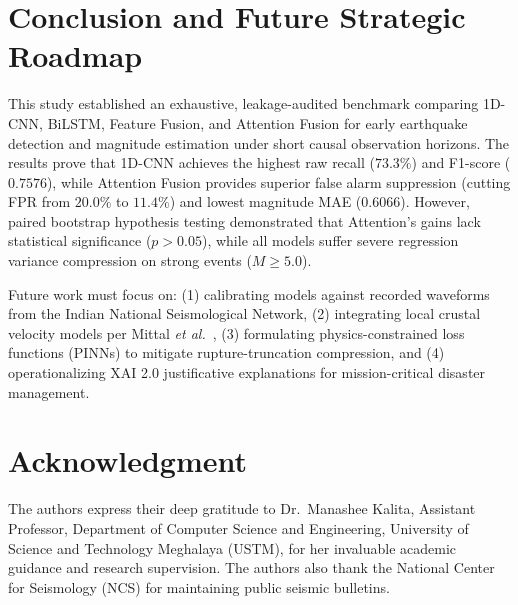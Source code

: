\documentclass[journal]{IEEEtran}
\begin{document}
\section{Conclusion and Future Strategic Roadmap}
This study established an exhaustive, leakage-audited benchmark comparing 1D-CNN, BiLSTM, Feature Fusion, and Attention Fusion for early earthquake detection and magnitude estimation under short causal observation horizons. The results prove that 1D-CNN achieves the highest raw recall ($73.3\%$) and F1-score ($0.7576$), while Attention Fusion provides superior false alarm suppression (cutting FPR from $20.0\%$ to $11.4\%$) and lowest magnitude MAE ($0.6066$). However, paired bootstrap hypothesis testing demonstrated that Attention's gains lack statistical significance ($p > 0.05$), while all models suffer severe regression variance compression on strong events ($M \ge 5.0$).

Future work must focus on: (1) calibrating models against recorded waveforms from the Indian National Seismological Network, (2) integrating local crustal velocity models per Mittal \textit{et al.}~\cite{mittal2025india}, (3) formulating physics-constrained loss functions (PINNs) to mitigate rupture-truncation compression, and (4) operationalizing XAI 2.0 justificative explanations for mission-critical disaster management.

\section*{Acknowledgment}
The authors express their deep gratitude to Dr.~Manashee Kalita, Assistant Professor, Department of Computer Science and Engineering, University of Science and Technology Meghalaya (USTM), for her invaluable academic guidance and research supervision. The authors also thank the National Center for Seismology (NCS) for maintaining public seismic bulletins.



\end{document}

